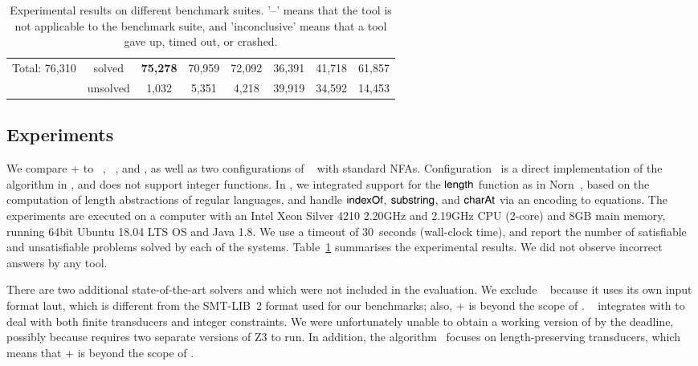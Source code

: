 \begin{table}[tbp]
\begin{center}
\begin{tabular}{|c|c|*{6}{c|}}
\hline 
\hline
\multirow{2}{*}{Total: 76,310} & \cellcolor{Gray} solved & \cellcolor{Gray}\bf{75,278}  & \cellcolor{Gray}70,959 & \cellcolor{Gray}72,092 & \cellcolor{Gray}36,391 & \cellcolor{Gray}41,718 & \cellcolor{Gray}61,857\\
\cline{2-8}
 &  unsolved &1,032  & 5,351  & 4,218 & 39,919 & 34,592 &14,453  \\
\hline
\end{tabular}
\end{center}
\caption{Experimental results on different benchmark suites.  '--' means that the tool is not applicable to the benchmark suite, and 'inconclusive' means that a tool gave up, timed out, or crashed.}
\label{tab-experiment}\vspace{-6mm}
\end{table}%

\vspace{-3mm}
\subsection{Experiments}\label{sec:exp-res}

We compare {\ostrich}+ to {\cvc}~\cite{cvc4}, {\zthree}~\cite{Z3-str},
and {\zthreetrau} \cite{Z3-trau}, as well as two configurations of
\ostrich~\cite{CHL+19} with standard NFAs. Configuration \ostrichi\ is
a direct implementation of the algorithm in \cite{CHL+19}, and does
not support integer functions. In \ostrichii, we integrated support
for the $\mathsf{length}$ function as in Norn~\cite{Abdulla14}, based on the
computation of length abstractions of regular languages, and handle
$\mathsf{indexOf}$, $\mathsf{substring}$, and $\mathsf{charAt}$ via an encoding to equations.
%
The experiments are executed on a computer with an Intel Xeon Silver 4210 2.20GHz and 2.19GHz CPU (2-core) and 8GB main memory, running 64bit Ubuntu 18.04 LTS OS and Java 1.8. We use a timeout of 30~seconds (wall-clock time), and report the number of satisfiable and unsatisfiable problems solved by each of the systems. Table~\ref{tab-experiment} summarises the experimental results. We did not observe incorrect answers by any tool.

There are two additional state-of-the-art solvers  {\slent} and {\trauplus} which were not included in
the evaluation. We exclude {\slent}~\cite{WC+18} because it uses its own input format laut, which is different from the SMT-LIB~2 format used for our
benchmarks; also, {\transducerbench+} is beyond the scope of {\slent}.
%
{\trauplus}~\cite{AbdullaA+19}  integrates {\trau} with {\sloth} to deal with both finite transducers and integer constraints. We were unfortunately unable
to obtain a working version of {\trauplus} by the deadline, possibly because {\trau} requires two separate versions of Z3 to run. In addition, the algorithm~\cite{AbdullaA+19} focuses on length-preserving transducers, which means that {\transducerbench}+ is beyond the scope of \trauplus.

